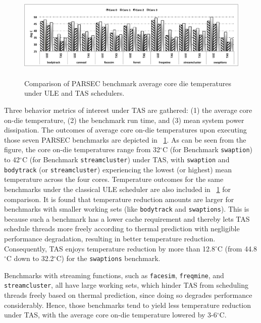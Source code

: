 \documentclass[times, 10pt,twocolumn]{IEEEtran}
\begin{document}
\begin{figure}[tbp] 
\centering
  \includegraphics[width=1.0\linewidth,height=1.7in]{graphics/parsectemp}
  \caption{Comparison of PARSEC benchmark average core die temperatures
under ULE and TAS schedulers.}
  \label{fig:pbenchmarkt}
\end{figure}
Three behavior metrics of interest under TAS are gathered: (1) the
average core on-die temperature, (2) the benchmark run time, and (3)
mean system power dissipation.  The outcomes of average core on-die
temperatures upon executing those seven PARSEC benchmarks are depicted
in \figurename~\ref{fig:pbenchmarkt}.  As can be seen from the figure,
the core on-die temperatures range from 32$^\circ$C (for Benchmark
\texttt{swaption}) to 42$^\circ$C (for Benchmark \texttt{streamcluster})
under TAS, with \texttt{swaption} and \texttt{bodytrack} (or
\texttt{streamcluster}) experiencing the lowest (or highest) mean
temperature across the four cores.  Temperature outcomes for the same
benchmarks under the classical ULE scheduler are also included in
\figurename~\ref{fig:pbenchmarkt} for comparison.  It is found that
temperature reduction amounts are larger for benchmarks with smaller
working sets (like \texttt{bodytrack} and \texttt{swaptions}).  This is
because such a benchmark has a lower cache requirement \cite{Bienia2011}
and thereby lets TAS schedule threads more freely according to thermal
prediction with negligible performance degradation, resulting in better
temperature reduction.  Consequently, TAS enjoys temperature reduction
by more than 12.8$^{\circ}$C (from 44.8$^{\circ}$C down to
32.2$^{\circ}$C) for the \texttt{swaptions} benchmark.
  
Benchmarks with streaming functions, such as \texttt{facesim},
\texttt{freqmine}, and \texttt{streamcluster}, all have large working
sets, which hinder TAS from scheduling threads freely based on thermal
prediction, since doing so degrades performance considerably.  Hence,
those benchmarks tend to yield less temperature reduction under TAS,
with the average core on-die temperature lowered by 3-6$^{\circ}$C.  
\end{document}
